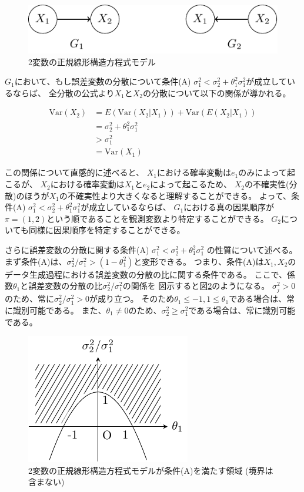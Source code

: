 \begin{figure}[h]
  \centering
  \includegraphics{./picture/bivariate_SEM.pdf}
  \caption{2変数の正規線形構造方程式モデル}
  \label{fig:ex_bivariate_SEM}
\end{figure}

$G_1$において、もし誤差変数の分散について条件(A)
$\sigma_1^2 < \sigma_2^2 + \theta_1^2 \sigma_1^2$が成立しているならば、
全分散の公式より$X_1$と$X_2$の分散について以下の関係が導かれる。

\begin{align*}
  \mathrm{Var}(X_2) &= E(\mathrm{Var}(X_2|X_1)) + \mathrm{Var}(E(X_2|X_1)) \\
                    &= \sigma_2^2 + \theta_1^2 \sigma_1^2 \\
                    &> \sigma_1^2 \\
                    &= \mathrm{Var}(X_1)
\end{align*}

この関係について直感的に述べると、
$X_1$における確率変動は$e_1$のみによって起こるが、
$X_2$における確率変動は$X_1$と$e_2$によって起こるため、
$X_2$の不確実性(分散)のほうが$X_1$の不確実性より大きくなると理解することができる。
よって、条件(A) $\sigma_1^2 < \sigma_2^2 + \theta_1^2 \sigma_1^2$が成立しているならば、
$G_1$における真の因果順序が$\pi = (1,2)$という順であることを観測変数より特定することができる。
$G_2$についても同様に因果順序を特定することができる。

さらに誤差変数の分散に関する条件(A) $\sigma_1^2 < \sigma_2^2 + \theta_1^2 \sigma_1^2$
の性質について述べる。
まず条件(A)は、$\sigma_2^2 / \sigma_1^2 > (1-\theta_1^2)$と変形できる。
つまり、条件(A)は$X_1, X_2$のデータ生成過程における誤差変数の分散の比に関する条件である。
ここで、係数$\theta_1$と誤差変数の分散の比$\sigma_2^2/ \sigma_1^2$の関係を
図示すると図\ref{fig:error_ratio}のようになる。
$\sigma_j^2 > 0$のため、常に$\sigma_2^2/ \sigma_1^2 > 0$が成り立つ。
そのため$\theta_1 \leq -1, 1 \leq \theta_1$である場合は、常に識別可能である。
また、$\theta_1 \neq 0$のため、$\sigma_2^2 \geq \sigma_1^2$である場合は、常に識別可能である。

\begin{figure}[htb]
  \centering
  \includegraphics{./picture/error_ratio.pdf}
  \caption{2変数の正規線形構造方程式モデルが条件(A)を満たす領域 (境界は含まない)}
  \label{fig:error_ratio}
\end{figure}
